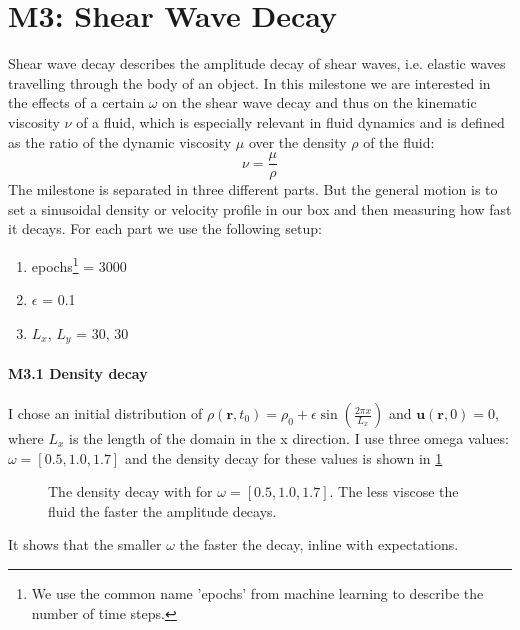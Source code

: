 \documentclass[a4paper,11pt]{article}
\begin{document}
\section{M3: Shear Wave Decay}
Shear wave decay describes the amplitude decay of shear waves, i.e. elastic waves travelling through the body of an object.
In this milestone we are interested in the effects of a certain $\omega$  on the shear wave decay and thus on the kinematic viscosity $\nu$ of a fluid, which is especially relevant in fluid dynamics and is defined as the ratio of the dynamic viscosity $\mu$ over the density $\rho$ of the fluid:
\begin{equation}
\nu = \frac{\mu}{\rho}
\end{equation}
The milestone is separated in three different parts. 
But the general motion is to set a sinusoidal density or velocity profile in our box and then measuring how fast it decays.
For each part we use the following setup:
\begin{enumerate}
    \item epochs\footnote{We use the common name 'epochs' from machine learning to describe the number of time steps. } = 3000
    \item $\epsilon$ = 0.1
    \item $L_{x}$, $L_{y}$ = 30, 30
\end{enumerate}

\paragraph{M3.1 Density decay} 
I chose an initial distribution of $\rho (\textbf{r},t_{0})=\rho_{0}+\epsilon \sin \left( \frac{2\pi x}{L_{x}} \right)$ and $\textbf{u}(\textbf{r},0)=0$, where $L_{x}$ is the length of the domain in the x direction.
I use three omega values: $\omega=[0.5,1.0,1.7]$ and the density decay for these values is shown in \ref{fig:m3-1}
\begin{figure}[ht]
\centering
\resizebox{\columnwidth}{!}{\large}
\vspace*{-10mm}
\caption[Density decay]{The density decay with for $\omega=[0.5,1.0,1.7]$. The less viscose the fluid the faster the amplitude decays.}
\label{fig:m3-1}
\end{figure}
It shows that the smaller $\omega$ the faster the decay, inline with expectations.
\end{document}
